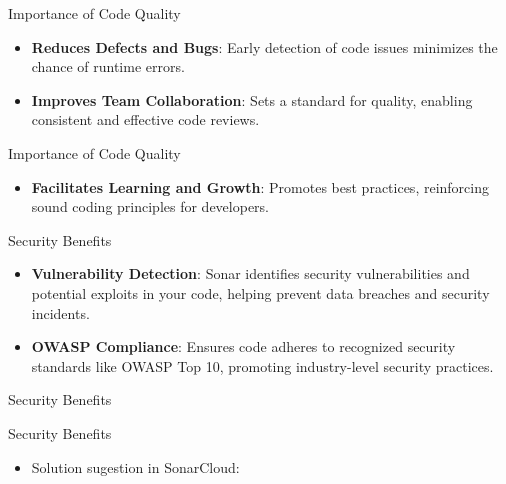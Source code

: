 \documentclass{beamer}
\begin{document}
\begin{frame}{Importance of Code Quality}
  \begin{itemize}
    \item \textbf{Reduces Defects and Bugs}: Early detection of code issues minimizes the chance of runtime errors.
    \vspace*{1em}
    \item \textbf{Improves Team Collaboration}: Sets a standard for quality, enabling consistent and effective code reviews.
  \end{itemize}
\end{frame}

\begin{frame}{Importance of Code Quality}
  \begin{itemize}
    \item \textbf{Facilitates Learning and Growth}: Promotes best practices, reinforcing sound coding principles for developers.
  \end{itemize}
\end{frame}


\begin{frame}{Security Benefits}
  \begin{itemize}
    \item \textbf{Vulnerability Detection}: Sonar identifies security vulnerabilities and potential exploits in your code, helping prevent data breaches and security incidents.
    \vspace*{1em}
    \item \textbf{OWASP Compliance}: Ensures code adheres to recognized security standards like OWASP Top 10, promoting industry-level security practices.
  \end{itemize}
\end{frame}

\begin{frame}{Security Benefits}
\end{frame}

\begin{frame}{Security Benefits}
  \begin{itemize}
    \item Solution sugestion in SonarCloud: 
  \end{itemize}
  \vspace*{2em}
\end{frame}
\end{document}
